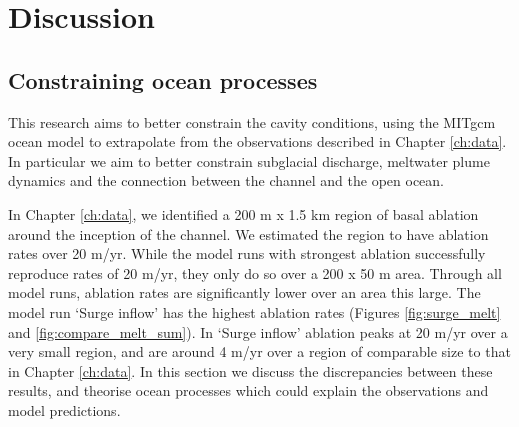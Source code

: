 \section{Discussion} \label{ocean_discuss}



\subsection{Constraining ocean processes}

This research aims to better constrain the cavity conditions, using the MITgcm ocean model to extrapolate from the observations described in Chapter \ref{ch:data}. In particular we aim to better constrain subglacial discharge, meltwater plume dynamics and the connection between the channel and the open ocean.

In Chapter \ref{ch:data}, we identified a 200 m x 1.5 km region of basal ablation around the inception of the channel. We estimated the region to have ablation rates over 20 m/yr. 
While the model runs with strongest ablation successfully reproduce rates of 20 m/yr, they only do so over a 200 x 50 m area. Through all model runs, ablation rates are significantly lower over an area this large. The model run `Surge inflow' has the highest ablation rates (Figures \ref{fig:surge_melt} and \ref{fig:compare_melt_sum}). In `Surge inflow' ablation peaks at 20 m/yr over a very small region, and are around 4 m/yr over a region of comparable size to that in Chapter \ref{ch:data}. In this section we discuss the discrepancies between these results, and theorise ocean processes which could explain the observations and model predictions.

